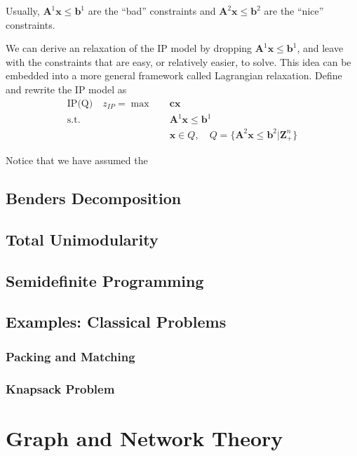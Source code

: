 				Usually, $\mathbf{A}^1 \mathbf{x} \le \mathbf{b}^1$ are the ``bad'' constraints and $\mathbf{A}^2 \mathbf{x} \le \mathbf{b}^2$ are the ``nice'' constraints.

				We can derive an relaxation of the IP model by dropping $\mathbf{A}^1 \mathbf{x} \le \mathbf{b}^1$, and leave with the constraints that are easy, or relatively easier, to solve. This idea can be embedded into a more general framework called Lagrangian relaxation. Define and rewrite the IP model as
				\begin{align*}
					\text{IP(Q)} \quad z_{IP} = \max \quad & \mathbf{cx}\\
												\text{s.t.} \quad & \mathbf{A}^1 \mathbf{x} \le \mathbf{b}^1 \\
												& \mathbf{x} \in Q, \quad  Q = \{\mathbf{A}^2 \mathbf{x} \le \mathbf{b}^2 | \mathbf{Z}_+^n\}
				\end{align*}

				Notice that we have assumed the 


		\chapter{Benders Decomposition}

		\chapter{Total Unimodularity}

		\chapter{Semidefinite Programming}

		\chapter{Examples: Classical Problems}
			\section{Packing and Matching}

			\section{Knapsack Problem}

	\part{Graph and Network Theory}\label{Graph}

